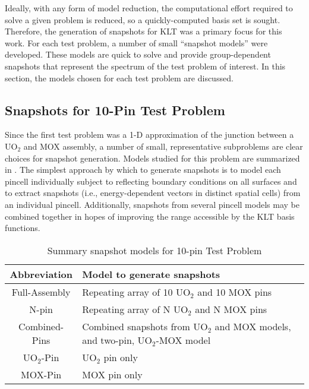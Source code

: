 Ideally, with any form of model reduction, the computational effort required to
solve a given problem is reduced, so a quickly-computed basis set is sought. 
Therefore, the generation of snapshots for KLT was a primary focus for this 
work.  For each test problem, a number of small ``snapshot models'' were 
developed. These models are quick to solve and provide group-dependent 
snapshots that represent the spectrum of the test problem of interest.  In 
this section, the models chosen for each test problem are discussed.

\subsection{Snapshots for 10-Pin Test Problem}

Since the first test problem was a 1-D approximation of the junction between a 
UO$_2$ and MOX assembly, a number of small, representative subproblems are 
clear 
choices for snapshot generation. Models studied for this problem are summarized 
in . The simplest approach by which to generate 
snapshots is to model each pincell individually subject to reflecting 
boundary 
conditions on all surfaces and to extract snapshots (i.e., energy-dependent 
vectors in distinct spatial cells) from an individual pincell.  Additionally, 
snapshots from several pincell models may be combined together in hopes of 
improving the range accessible by the KLT basis functions.

\begin{table*}[htb]
    \centering
    \caption{Summary snapshot models for 10-pin Test Problem}
    \begin{tabulary}{\linewidth}{c | L}\toprule
        Abbreviation    & Model to generate snapshots \\ \midrule
        Full-Assembly   & Repeating array of 10 UO$_2$ and 10 MOX pins \\
        N-pin           & Repeating array of N UO$_2$ and N MOX pins \\ 
        Combined-Pins   & Combined snapshots from UO$_2$ and MOX models, and 
        two-pin, UO$_2$-MOX model \\
        UO$_2$-Pin      & UO$_2$ pin only \\
        MOX-Pin         & MOX pin only \\
        \bottomrule
    \end{tabulary}
    \label{tab:snapshots}
\end{table*}

